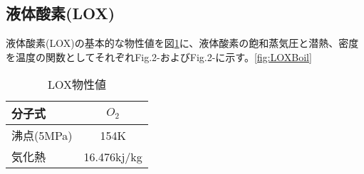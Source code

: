 \subsection{液体酸素(LOX)}
液体酸素(LOX)の基本的な物性値を図\ref{tab:LOX}に、液体酸素の飽和蒸気圧と潜熱、密度を温度の関数としてそれぞれFig.2-およびFig.2-に示す。\ref{fig:LOXBoil}

\begin{table}[htb]
\begin{center}
\caption{LOX物性値}
\begin{tabular}{|l||c|} \hline
分子式 & $O_{2}$ \\ \hline
沸点(5MPa) & 154K \\ \hline
気化熱 & 16.476kj/kg \\ \hline
\end{tabular}
\label{tab:LOX}
\end{center}
\end{table}

%
